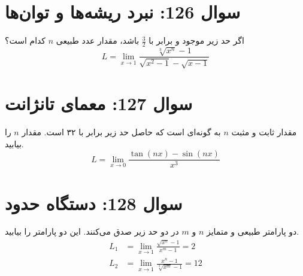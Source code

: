 \documentclass[12pt]{article}
\begin{document}
\vspace{1cm}
\hrulefill
\vspace{1cm}
\section*{سوال 126: نبرد ریشه‌ها و توان‌ها}
اگر حد زیر موجود و برابر با \( \frac{3}{2} \) باشد، مقدار عدد طبیعی \(n\) کدام است؟
\begin{displaymath}
	L = \lim_{x \to 1} \frac{\sqrt[3]{x^n} - 1}{\sqrt{x^2 - 1} - \sqrt{x-1}}
\end{displaymath}

\vspace{1cm}
\hrulefill
\vspace{1cm}

\section*{سوال 127: معمای تانژانت}
مقدار ثابت و مثبت \(n\) به گونه‌ای است که حاصل حد زیر برابر با ۳۲ است. مقدار \(n\) را بیابید.
\begin{displaymath}
	L = \lim_{x \to 0} \frac{\tan(nx) - \sin(nx)}{x^3}
\end{displaymath}

\vspace{1cm}
\hrulefill
\vspace{1cm}

\section*{سوال 128: دستگاه حدود}
دو پارامتر طبیعی و متمایز \(n\) و \(m\) در دو حد زیر صدق می‌کنند. این دو پارامتر را بیابید.
\begin{align*}
	L_1 &= \lim_{x \to 1} \frac{\sqrt{x^n} - 1}{x^m - 1} = 2 \\
	L_2 &= \lim_{x \to 1} \frac{x^n - 1}{\sqrt[3]{x^m} - 1} = 12
\end{align*}
\end{document}
